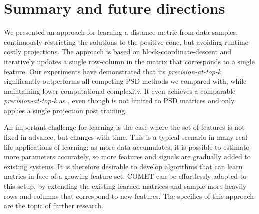 \documentclass{article} %
\begin{document}
\section{Summary and future directions}
We presented an approach for learning a distance metric from data samples, continuously restricting the solutions to the positive cone, but avoiding runtime-costly projections. The approach is based on block-coordinate-descent and iteratively updates a single row-column in the matrix that corresponds to a single feature. Our experiments have demonstrated that its \textit{precision-at-top-k} significantly outperforms all competing PSD methods we compared with, while maintaining lower computational complexity. It even achieves a comparable \textit{precision-at-top-k} as \cite{OASIS}, even though \cite{OASIS} is not limited to PSD matrices and only applies a single projection post training

An important challenge for learning is the case where the set of features is not fixed in advance, but changes with time. This is a typical scenario in many real life applications of learning: as more data accumulates, it is possible to estimate more parameters accurately, so more features and signals are gradually added to existing systems. It is therefore desirable to develop algorithms that can learn metrics in face of a growing feature set. COMET can be effortlessly adapted to this setup, by extending the existing learned matrices and sample more heavily rows and columns that correspond to new features. The specifics of this approach are the topic of further research.


\newpage

\small{

%
}
\end{document}
